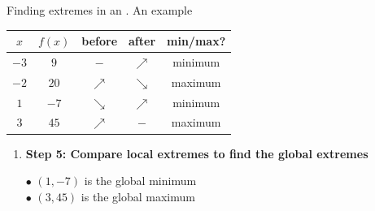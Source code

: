 \documentclass[9pt]{beamer}
\begin{document}
\begin{frame}{Finding  extremes in an . An example}
\begin{minipage}{0.53\textwidth}
\begin{enumerate}[leftmargin = 0.2cm, label = , rightmargin = 0.1cm]
            \begin{table}
            \begin{flushleft}
            \begin{tabular}{c|cccc}
                $x$     & $f(x)$    & before    & after     & min/max? \\ \hline
                $-3$    & $9$       & $-$        & $\nearrow$  & minimum  \\
                $-2$    & $20$      & $\nearrow$  & $\searrow$  & maximum  \\
                $1$     & $-7$      & $\searrow$  & $\nearrow$  & minimum  \\
                $3$     & $45$      & $\nearrow$  & $-$        & maximum
            \end{tabular}
            \end{flushleft}
            \end{table}
            
            \end{enumerate}
            
        \end{minipage}
        \begin{minipage}{0.43\textwidth}
            \vspace{-1.59cm}
            
            \begin{enumerate}[leftmargin = 0.2cm, label = , rightmargin = 0.1cm]
            
            \item \textbf{Step 5: Compare local extremes to find the global extremes}

            $\bullet$ $(1, -7)$ is the global minimum \\ 
            $\bullet$ $(3, 45)$ is the global maximum
        
            \end{enumerate}
            
        \end{minipage}
    
\end{frame}
\end{document}
